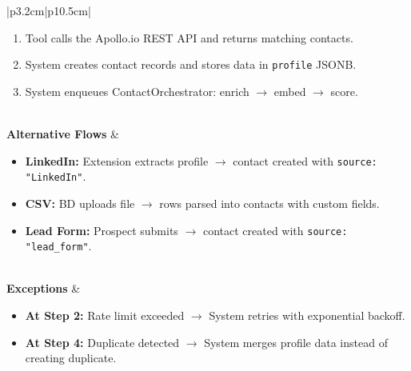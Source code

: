 \documentclass[a4paper]{article}
\begin{document}
\begin{table}[H]
\begin{tabular}{|p{3.2cm}|p{10.5cm}|}
\begin{minipage}[t]{\linewidth}
\begin{enumerate}[nosep,leftmargin=*]
  extracted filter parameters.
  \item Tool calls the Apollo.io REST API and returns matching 
  contacts.
  \item System creates contact records and stores data in 
  \texttt{profile} JSONB.
  \item System enqueues ContactOrchestrator: enrich $\rightarrow$ 
  embed $\rightarrow$ score.
\end{enumerate}
\end{minipage} \\
\hline
\textbf{Alternative Flows} &
\begin{minipage}[t]{\linewidth}
\begin{itemize}[nosep,leftmargin=*]
  \item \textbf{LinkedIn:} Extension extracts profile $\rightarrow$ 
  contact created with \texttt{source: "LinkedIn"}.
  \item \textbf{CSV:} BD uploads file $\rightarrow$ rows parsed 
  into contacts with custom fields.
  \item \textbf{Lead Form:} Prospect submits $\rightarrow$ contact 
  created with \texttt{source: "lead\_form"}.
\end{itemize}
\end{minipage} \\
\hline
\textbf{Exceptions} &
\begin{minipage}[t]{\linewidth}
\begin{itemize}[nosep,leftmargin=*]
  \item \textbf{At Step 2:} Rate limit exceeded $\rightarrow$ 
  System retries with exponential backoff.
  \item \textbf{At Step 4:} Duplicate detected $\rightarrow$ 
  System merges profile data instead of creating duplicate.
\end{itemize}
\end{minipage} \\
\hline
\end{tabular}
\end{table}
\end{document}
